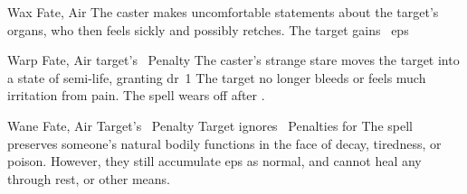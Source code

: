 \ifodd\value{diceNo}
  {}%
  {Wax}%
  {Fate, Air}%
  {}%
  {The caster makes uncomfortable statements about the target's organs, who then feels sickly and possibly retches.
  The target gains ~\glspl{ep}}%
  {}

\else

  {}%
  {Warp}%
  {Fate, Air}%
  {target's ~Penalty}%
  {The caster's strange stare moves the target into a state of semi-life, granting \gls{dr}~1}%
  {
    The target no longer bleeds or feels much irritation from pain.
    The spell wears off after .}

  {}%
  {Wane}%
  {Fate, Air}%
  {Target's ~Penalty}%
  {Target ignores  ~Penalties for }%
  {The spell preserves someone's natural bodily functions in the face of decay, tiredness, or poison.
    However, they still accumulate \glspl{ep} as normal, and cannot heal any through rest, or other means.}

\fi
{}
